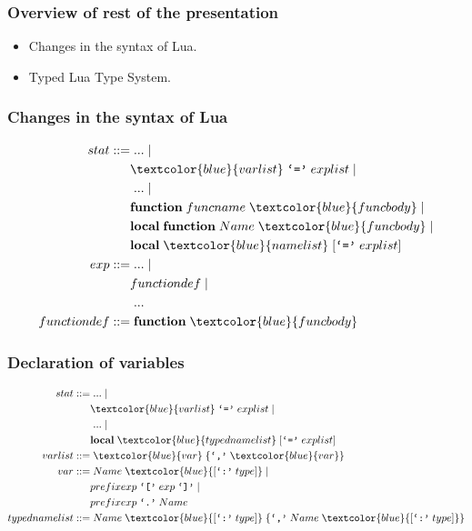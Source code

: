 \documentclass{beamer}
\begin{document}
\begin{frame}
\frametitle{Overview of rest of the presentation}
\begin{itemize}
\item Changes in the syntax of Lua.
\item Typed Lua Type System.
\end{itemize}
\end{frame}

\begin{frame}
\frametitle{Changes in the syntax of Lua}
\begin{align*}
stat ::= & \; ... \; |\\
& \textcolor{blue}{varlist} \; \texttt{`='} \; explist \; |\\
& \; ... \; |\\
& \textbf{function} \; funcname \; \textcolor{blue}{funcbody} \; |\\
& \textbf{local} \; \textbf{function} \; Name \; \textcolor{blue}{funcbody} \; |\\
& \textbf{local} \; \textcolor{blue}{namelist} \; [\texttt{`='} \; explist]\\
exp ::= & \; ... \; |\\
& functiondef \; |\\
& \; ...\\
functiondef ::= & \; \textbf{function} \; \textcolor{blue}{funcbody}
\end{align*}
\end{frame}

\begin{frame}
\frametitle{Declaration of variables}
\begin{align*}
stat ::= & \; ... \; |\\
& \textcolor{blue}{varlist} \; \texttt{`='} \; explist \; |\\
& \; ... \; |\\
& \textbf{local} \; \textcolor{blue}{typednamelist} \; [\texttt{`='} \; explist]\\
varlist ::= & \; \textcolor{blue}{var} \; \{\texttt{`,'} \; \textcolor{blue}{var}\}\\
var ::= & \; Name \; \textcolor{blue}{[\texttt{`:'} \; type]} \; |\\
& prefixexp \; \texttt{`['} \; exp \; \texttt{`]'} \; |\\
& prefixexp \; \texttt{`.'} \; Name\\
typednamelist ::= & \; Name \; \textcolor{blue}{[\texttt{`:'} \; type]} \;
\{\texttt{`,'} \; Name \; \textcolor{blue}{[\texttt{`:'} \; type]}\}
\end{align*}
\end{frame}
\end{document}
